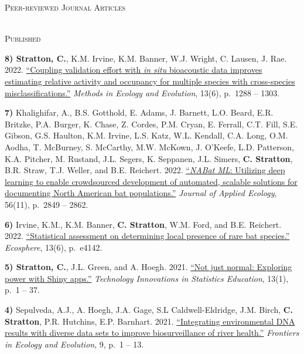 \documentclass[a4paper]{article}
\newcommand{\lineunder} {
	\vspace*{-8pt} \\
	\hspace*{-18pt} \hrulefill \\
}
\newcommand{\header} [1] {
	{\hspace*{-18pt}\vspace*{6pt} \textcolor{Cerulean}{\textsc{#1}}}
	\vspace*{-6pt} \textcolor{Cerulean}{\lineunder}
}
\newcommand{\subheader} [1] {
	{\hspace*{-9pt}\vspace*{6pt} \textcolor{Cerulean}{\textsc{#1}}}
	\vspace*{-6pt}
}
\begin{document}
\header{Peer-reviewed Journal Articles}
\vspace*{2mm}

\subheader{Published}
\vspace*{2mm}

\textbf{8) Stratton, C.}, K.M. Irvine, K.M. Banner, W.J. Wright, C.
Lausen, J. Rae. 2022.
\href{https://doi.org/10.1111/2041-210X.13831}{``Coupling validation
effort with \emph{in situ} bioacoustic data improves estimating relative
activity and occupancy for multiple species with cross-species
misclassifications.''} \textit{Methods in Ecology and Evolution}, 13(6),
p.~1288 -- 1303. \vspace*{2mm}

\textbf{7)} Khalighifar, A., B.S. Gotthold, E. Adams, J. Barnett, L.O.
Beard, E.R. Britzke, P.A. Burger, K. Chase, Z. Cordes, P.M. Cryan, E.
Ferrall, C.T. Fill, S.E. Gibson, G.S. Haulton, K.M. Irvine, L.S. Katz,
W.L. Kendall, C.A. Long, O.M. Aodha, T. McBurney, S. McCarthy, M.W.
McKown, J. O'Keefe, L.D. Patterson, K.A. Pitcher, M. Rustand, J.L.
Segers, K. Seppanen, J.L. Simers, \textbf{C. Stratton}, B.R. Straw, T.J.
Weller, and B.E. Reichert. 2022.
\href{https://doi.org/10.1111/1365-2664.14280}{``\emph{NABat ML}:
Utilizing deep learning to enable crowdsourced development of automated,
scalable solutions for documenting North American bat populations.''}
\textit{Journal of Applied Ecology}, 56(11), p.~2849 -- 2862.
\vspace*{2mm}

\textbf{6)} Irvine, K.M., K.M. Banner, \textbf{C. Stratton}, W.M. Ford,
and B.E. Reichert. 2022.
\href{https://doi.org/10.1002/ecs2.4142}{``Statistical assessment on
determining local presence of rare bat species.''} \textit{Ecosphere},
13(6), p.~e4142. \vspace*{2mm}

\textbf{5) Stratton, C.}, J.L. Green, and A. Hoegh. 2021.
\href{https://doi.org/10.5070/T513146468}{``Not just normal: Exploring
power with Shiny apps.''}
\textit{Technology Innovations in Statistics Education}, 13(1), p.~1 --
37. \vspace*{2mm}

\textbf{4)} Sepulveda, A.J., A. Hoegh, J.A. Gage, S.L Caldwell-Eldridge,
J.M. Birch, \textbf{C. Stratton}, P.R. Hutchins, E.P. Barnhart. 2021.
\href{https://doi.org/10.3389/fevo.2021.620715}{``Integrating
environmental DNA results with diverse data sets to improve
biosurveillance of river health.''}
\textit{Frontiers in Ecology and Evolution}, 9, p.~1 -- 13.
\vspace*{2mm}
\end{document}
